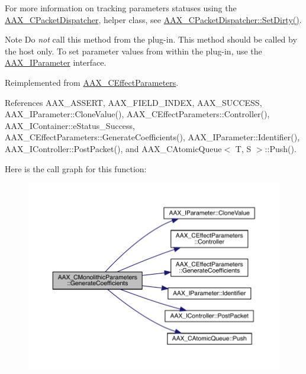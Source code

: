 For more information on tracking parameters\textquotesingle{} statuses using the \mbox{\hyperlink{a01529}{A\+A\+X\+\_\+\+C\+Packet\+Dispatcher}}, helper class, see \mbox{\hyperlink{a01529_a6d4254a842eeee46a227ec761619efb5}{A\+A\+X\+\_\+\+C\+Packet\+Dispatcher\+::\+Set\+Dirty()}}.

\begin{DoxyNote}{Note}
Do {\itshape not} call this method from the plug-\/in. This method should be called by the host only. To set parameter values from within the plug-\/in, use the \mbox{\hyperlink{a01857}{A\+A\+X\+\_\+\+I\+Parameter}} interface. 
\end{DoxyNote}


Reimplemented from \mbox{\hyperlink{a01481_a2ae4c7e4ed12f2763934da50aa5730f3}{A\+A\+X\+\_\+\+C\+Effect\+Parameters}}.



References A\+A\+X\+\_\+\+A\+S\+S\+E\+RT, A\+A\+X\+\_\+\+F\+I\+E\+L\+D\+\_\+\+I\+N\+D\+EX, A\+A\+X\+\_\+\+S\+U\+C\+C\+E\+SS, A\+A\+X\+\_\+\+I\+Parameter\+::\+Clone\+Value(), A\+A\+X\+\_\+\+C\+Effect\+Parameters\+::\+Controller(), A\+A\+X\+\_\+\+I\+Container\+::e\+Status\+\_\+\+Success, A\+A\+X\+\_\+\+C\+Effect\+Parameters\+::\+Generate\+Coefficients(), A\+A\+X\+\_\+\+I\+Parameter\+::\+Identifier(), A\+A\+X\+\_\+\+I\+Controller\+::\+Post\+Packet(), and A\+A\+X\+\_\+\+C\+Atomic\+Queue$<$ T, S $>$\+::\+Push().

Here is the call graph for this function\+:
\nopagebreak
\begin{figure}[H]
\begin{center}
\leavevmode
\includegraphics[width=350pt]{a01969_a626cb2aaa68c64238298acfd6db448f5_cgraph}
\end{center}
\end{figure}
\mbox{\label{a01969_a43db72446afba852f68d19d92c2aa05b}} 
